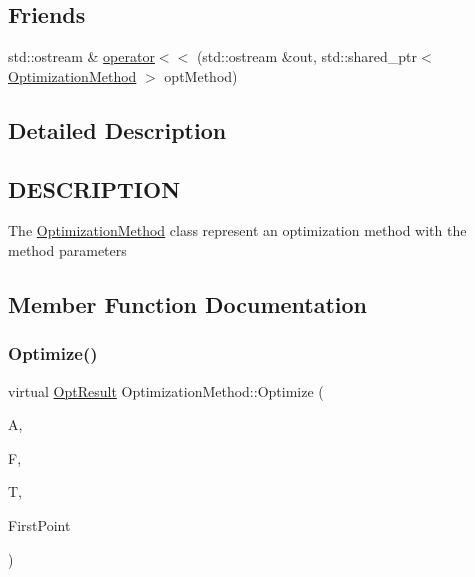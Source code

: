 \subsection*{Friends}
\begin{DoxyCompactItemize}
\item 
std\+::ostream \& \hyperlink{class_optimization_method_ad4282eaeda272e5bec7a542d1889253a}{operator$<$$<$} (std\+::ostream \&out, std\+::shared\+\_\+ptr$<$ \hyperlink{class_optimization_method}{Optimization\+Method} $>$ opt\+Method)
\end{DoxyCompactItemize}


\subsection{Detailed Description}
\hypertarget{function_8h_DESCRIPTION}{}\subsection{D\+E\+S\+C\+R\+I\+P\+T\+I\+ON}\label{function_8h_DESCRIPTION}
The \hyperlink{class_optimization_method}{Optimization\+Method} class represent an optimization method with the method parameters 

\subsection{Member Function Documentation}
\mbox{\label{class_optimization_method_a98a1e917667c3ca851cbcd9068b0a9d9}} 
\subsubsection{\texorpdfstring{Optimize()}{Optimize()}}
{\footnotesize\ttfamily virtual \hyperlink{struct_opt_result}{Opt\+Result} Optimization\+Method\+::\+Optimize (\begin{DoxyParamCaption}\item[{std\+::shared\+\_\+ptr$<$ \hyperlink{class_area}{Area} $>$}]{A,  }\item[{std\+::shared\+\_\+ptr$<$ \hyperlink{class_function}{Function} $>$}]{F,  }\item[{std\+::shared\+\_\+ptr$<$ \hyperlink{class_terminal_condition}{Terminal\+Condition} $>$}]{T,  }\item[{const \hyperlink{classv_point}{v\+Point} \&}]{First\+Point }\end{DoxyParamCaption})\hspace{0.3cm}{\ttfamily [pure virtual]}}

